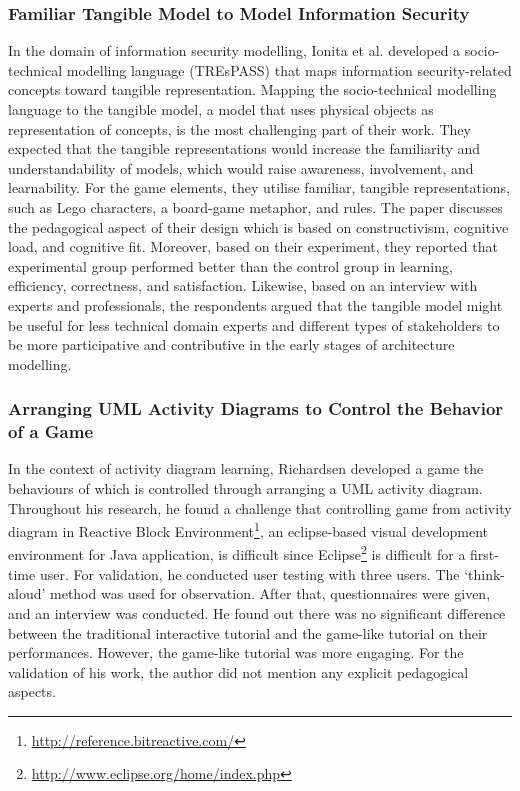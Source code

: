 \documentclass[12pt, a4paper]{report}
\begin{document}
{\subsubsection{Familiar Tangible Model to Model Information Security}
In the domain of information security modelling, Ionita et al.\cite{Ionita2015} developed a socio-technical modelling language (TREsPASS) that maps information security-related concepts toward tangible representation. Mapping the socio-technical modelling language to the tangible model, a model that uses physical objects as representation of concepts, is the most challenging part of their work. They expected that the tangible representations would increase the familiarity and understandability of models, which would raise awareness, involvement, and learnability. For the game elements, they utilise familiar, tangible representations, such as Lego characters, a board-game metaphor, and rules. The paper discusses the pedagogical aspect of their design which is based on constructivism, cognitive load, and cognitive fit. Moreover, based on their experiment, they reported that experimental group performed better than the control group in learning, efficiency, correctness, and satisfaction. Likewise, based on an interview with experts and professionals, the respondents argued that the tangible model might be useful for less technical domain experts and different types of stakeholders to be more participative and contributive in the early stages of architecture modelling.

\subsubsection{Arranging UML Activity Diagrams to Control the Behavior of a Game}
In the context of activity diagram learning, Richardsen \cite{Richardsen2014} developed a game the behaviours of which is controlled through arranging a UML activity diagram. Throughout his research, he found a challenge that controlling game from activity diagram in Reactive Block Environment\footnote{\url{http://reference.bitreactive.com/}}, an eclipse-based visual development environment for Java application, is difficult since Eclipse\footnote{\url{http://www.eclipse.org/home/index.php}} is difficult for a first-time user. For validation, he conducted user testing with three users. The `think-aloud' method was used for observation. After that, questionnaires were given, and an interview was conducted. He found out there was no significant difference between the traditional interactive tutorial and the game-like tutorial on their performances. However, the game-like tutorial was more engaging. For the validation of his work, the author did not mention any explicit pedagogical aspects.\\

}
\end{document}
